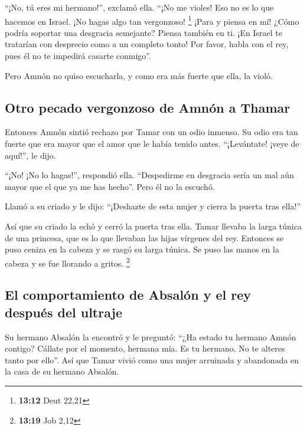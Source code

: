 ``¡No, tú eres mi hermano!'', exclamó ella. ``¡No me
violes! Eso no es lo que hacemos en Israel. ¡No hagas algo tan
vergonzoso! \footnote{\textbf{13:12} Deut 22,21}  ¡Para y
piensa en mí! ¿Cómo podría soportar una desgracia semejante? Piensa
también en ti. ¡En Israel te tratarían con desprecio como a un completo
tonto! Por favor, habla con el rey, pues él no te impedirá casarte
conmigo''.

 Pero Amnón no quiso escucharla, y como era más fuerte
que ella, la violó.

\hypertarget{otro-pecado-vergonzoso-de-amnuxf3n-a-thamar}{%
\subsection{Otro pecado vergonzoso de Amnón a
Thamar}\label{otro-pecado-vergonzoso-de-amnuxf3n-a-thamar}}

 Entonces Amnón sintió rechazo por Tamar con un odio
inmenso. Su odio era tan fuerte que era mayor que el amor que le había
tenido antes. ``¡Levántate! ¡veye de aquí!'', le dijo.

 ``¡No! ¡No lo hagas!'', respondió ella. ``Despedirme en
desgracia sería un mal aún mayor que el que ya me has hecho''. Pero él
no la escuchó.

 Llamó a su criado y le dijo: ``¡Deshazte de esta mujer y
cierra la puerta tras ella!''

 Así que su criado la echó y cerró la puerta tras ella.
Tamar llevaba la larga túnica de una princesa, que es lo que llevaban
las hijas vírgenes del rey.  Entonces se puso ceniza en
la cabeza y se rasgó su larga túnica. Se puso las manos en la cabeza y
se fue llorando a gritos. \footnote{\textbf{13:19} Job 2,12}

\hypertarget{el-comportamiento-de-absaluxf3n-y-el-rey-despuuxe9s-del-ultraje}{%
\subsection{El comportamiento de Absalón y el rey después del
ultraje}\label{el-comportamiento-de-absaluxf3n-y-el-rey-despuuxe9s-del-ultraje}}

 Su hermano Absalón la encontró y le preguntó: ``¿Ha
estado tu hermano Amnón contigo? Cállate por el momento, hermana mía. Es
tu hermano. No te alteres tanto por ello''. Así que Tamar vivió como una
mujer arruinada y abandonada en la casa de su hermano Absalón.


